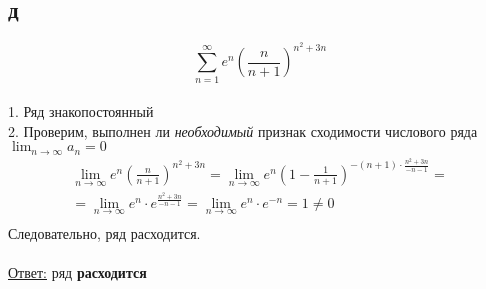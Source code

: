 \documentclass[a5paper, 10pt]{article}
\theoremstyle{definition}
\theoremstyle{plain}
\theoremstyle{remark}
\begin{document}
\subsection{д}
\begin{equation}
\sum \limits_{n = 1}^{\infty} e^n \left( \frac{n}{n+1} \right)^{n^2+3n}
\end{equation}
\\
1. Ряд знакопостоянный\\
2. Проверим, выполнен ли \textit{необходимый} признак сходимости числового ряда $ \lim_{n \to \infty} a_n = 0$
\begin{multline*}
\lim_{n \to \infty} e^n \left( \frac{n}{n+1} \right)^{n^2+3n} =
 \lim_{n \to \infty} e^n \left( 1-\frac{1}{n+1} \right)^{-(n+1) \cdot \frac{n^2+3n}{-n-1}} = \\ =
\lim_{n \to \infty} e^n\cdot e^{ \frac{n^2+3n}{-n-1}}  = \lim_{n \to \infty} e^n\cdot e^{-n} = 1 \neq 0 \\
\end{multline*}
Следовательно, ряд расходится.\\\\
\underline{Ответ:} ряд  \textbf{расходится}


\newpage
\end{document}
